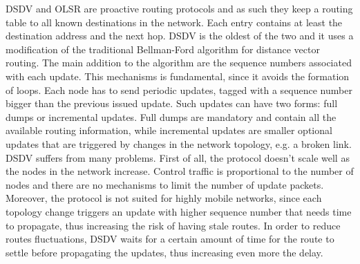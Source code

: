 \gls{DSDV} and \gls{OLSR} are proactive routing protocols and as such they keep a routing table to all known destinations in the network. Each entry contains at least the destination address and the next hop. \gls{DSDV} is the oldest of the two and it uses a modification of the traditional Bellman-Ford algorithm for distance vector routing. The main addition to the algorithm are the sequence numbers associated with each update. This mechanisms is fundamental, since it avoids the formation of loops. Each node has to send periodic updates, tagged with a sequence number bigger than the previous issued update. Such updates can have two forms: full dumps or incremental updates. Full dumps are mandatory and contain all the available routing information, while incremental updates are smaller optional updates that are triggered by changes in the network topology, e.g. a broken link. \gls{DSDV} suffers from many problems. First of all, the protocol doesn't scale well as the nodes in the network increase. Control traffic is proportional to the number of nodes and there are no mechanisms to limit the number of update packets. Moreover, the protocol is not suited for highly mobile networks, since each topology change triggers an update with higher sequence number that needs time to propagate, thus increasing the risk of having stale routes. In order to reduce routes fluctuations, \gls{DSDV} waits for a certain amount of time for the route to settle before propagating the updates, thus increasing even more the delay. \\ \\
